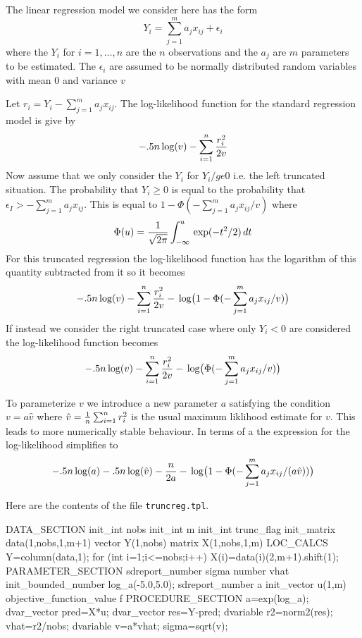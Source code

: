 %
%


The linear regression model we consider here has the form
$$Y_i=\sum_{j=1}^m a_j x_{ij} +\epsilon_i$$
where the $Y_i$ for $i=1,\ldots,n$ are the $n$ observations
and the $a_j$ are $m$ parameters to be estimated.  
The $\epsilon_i$ are assumed to be normally distributed random 
variables with mean $0$ and variance $v$ 

Let $r_i=Y_i-\sum_{j=1}^m a_j x_{ij}$. The log-likelihood function 
for the standard regression model is give by
$$ -.5n\log(v) - \sum_{i=1}^n  {r_i^2 \over 2v}$$
Now assume that we only consider the $Y_i$ for $Y_i/ge 0$
i.e. the left truncated situation.
The probability that $Y_i\ge 0$ is equal to the probability that
$\epsilon_I>-\sum_{j=1}^m a_j x_{ij} $. This is equal to 
$1-\Phi(-\sum_{j=1}^m a_j x_{ij} /v)$ where
$$\Phi(u)={1\over\sqrt{2\pi}}\int_{-\infty}^u \exp(-t^2/2)\,dt$$
For this truncated regression the log-likelihood function
has the logarithm of this quantity subtracted from it
so it becomes 
$$ -.5n\log(v) - \sum_{i=1}^n  {r_i^2 \over 2v}
   -\log\big(1-\Phi(-\sum_{j=1}^m a_j x_{ij} /v)\big)$$
If instead we consider the right truncated case where only $Y_i<0$
are considered the log-likelihood function becomes
$$ -.5n\log(v) - \sum_{i=1}^n    {r_i^2 \over 2v}
   -\log\big(\Phi(-\sum_{j=1}^m a_j x_{ij} /v)\big)$$
 

To parameterize $v$ we introduce a new parameter $a$ satisfying
the condition $v=a\hat v$ where 
$\hat v={1\over n}\sum_{i=1}^n  r_i^2$ is the usual maximum liklihood
estimate for $v$. This leads to more
numerically stable behaviour. In terms of a the 
expression for the log-likelihood simplifies to
$$ -.5n\log(a)-.5n\log(\hat v) - {n\over 2a}
   -\log\big(1-\Phi(-\sum_{j=1}^m a_j x_{ij}/(a \hat v))\big)$$

Here are the contents of the file {\tt truncreg.tpl}.

\beginexample
DATA\_SECTION
  init\_int nobs
  init\_int m
  init\_int trunc\_flag
  init\_matrix data(1,nobs,1,m+1)
  vector Y(1,nobs)
  matrix X(1,nobs,1,m)
 LOC\_CALCS
  Y=column(data,1);
  for (int i=1;i<=nobs;i++)
  {
    X(i)=data(i)(2,m+1).shift(1);
  }
PARAMETER\_SECTION
  sdreport\_number sigma
  number vhat
  init\_bounded\_number log\_a(-5.0,5.0);
  sdreport\_number a
  init\_vector u(1,m)
  objective\_function\_value f
PROCEDURE\_SECTION
  a=exp(log\_a);
  dvar\_vector pred=X*u;
  dvar\_vector res=Y-pred;
  dvariable r2=norm2(res); 
  vhat=r2/nobs; 
  dvariable v=a*vhat;
  sigma=sqrt(v);


